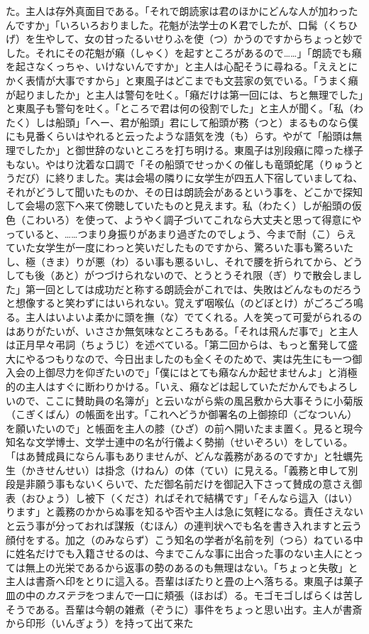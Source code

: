 \documentclass{book}
\begin{document}
た。主人は存外真面目である。「それで朗読家は君のほかにどんな人が加わったんですか」「いろいろおりました。花魁が法学士のＫ君でしたが、口髯（くちひげ）を生やして、女の甘ったるいせりふを使（つ）かうのですからちょっと妙でした。それにその花魁が癪（しゃく）を起すところがあるので\ldots{}\ldots{}」「朗読でも癪を起さなくっちゃ、いけないんですか」と主人は心配そうに尋ねる。「ええとにかく表情が大事ですから」と東風子はどこまでも文芸家の気でいる。「うまく癪が起りましたか」と主人は警句を吐く。「癪だけは第一回には、ちと無理でした」と東風子も警句を吐く。「ところで君は何の役割でした」と主人が聞く。「私（わたく）しは船頭」「へー、君が船頭」君にして船頭が務（つと）まるものなら僕にも見番くらいはやれると云ったような語気を洩（も）らす。やがて「船頭は無理でしたか」と御世辞のないところを打ち明ける。東風子は別段癪に障った様子もない。やはり沈着な口調で「その船頭でせっかくの催しも竜頭蛇尾（りゅうとうだび）に終りました。実は会場の隣りに女学生が四五人下宿していましてね、それがどうして聞いたものか、その日は朗読会があるという事を、どこかで探知して会場の窓下へ来て傍聴していたものと見えます。私（わたく）しが船頭の仮色（こわいろ）を使って、ようやく調子づいてこれなら大丈夫と思って得意にやっていると、\ldots{}\ldots{}つまり身振りがあまり過ぎたのでしょう、今まで耐（こ）らえていた女学生が一度にわっと笑いだしたものですから、驚ろいた事も驚ろいたし、極（きま）りが悪（わ）るい事も悪るいし、それで腰を折られてから、どうしても後（あと）がつづけられないので、とうとうそれ限（ぎ）りで散会しました」第一回としては成功だと称する朗読会がこれでは、失敗はどんなものだろうと想像すると笑わずにはいられない。覚えず咽喉仏（のどぼとけ）がごろごろ鳴る。主人はいよいよ柔かに頭を撫（な）でてくれる。人を笑って可愛がられるのはありがたいが、いささか無気味なところもある。「それは飛んだ事で」と主人は正月早々弔詞（ちょうじ）を述べている。「第二回からは、もっと奮発して盛大にやるつもりなので、今日出ましたのも全くそのためで、実は先生にも一つ御入会の上御尽力を仰ぎたいので」「僕にはとても癪なんか起せませんよ」と消極的の主人はすぐに断わりかける。「いえ、癪などは起していただかんでもよろしいので、ここに賛助員の名簿が」と云いながら紫の風呂敷から大事そうに小菊版（こぎくばん）の帳面を出す。「これへどうか御署名の上御捺印（ごなついん）を願いたいので」と帳面を主人の膝（ひざ）の前へ開いたまま置く。見ると現今知名な文学博士、文学士連中の名が行儀よく勢揃（せいぞろい）をしている。「はあ賛成員にならん事もありませんが、どんな義務があるのですか」と牡蠣先生（かきせんせい）は掛念（けねん）の体（てい）に見える。「義務と申して別段是非願う事もないくらいで、ただ御名前だけを御記入下さって賛成の意さえ御表（おひょう）し被下（くださ）ればそれで結構です」「そんなら這入（はい）ります」と義務のかからぬ事を知るや否や主人は急に気軽になる。責任さえないと云う事が分っておれば謀叛（むほん）の連判状へでも名を書き入れますと云う顔付をする。加之（のみならず）こう知名の学者が名前を列（つら）ねている中に姓名だけでも入籍させるのは、今までこんな事に出合った事のない主人にとっては無上の光栄であるから返事の勢のあるのも無理はない。「ちょっと失敬」と主人は書斎へ印をとりに這入る。吾輩はぼたりと畳の上へ落ちる。東風子は菓子皿の中の\emph{カステラ}をつまんで一口に頬張（ほおば）る。モゴモゴしばらくは苦しそうである。吾輩は今朝の雑煮（ぞうに）事件をちょっと思い出す。主人が書斎から印形（いんぎょう）を持って出て来た
\end{document}
